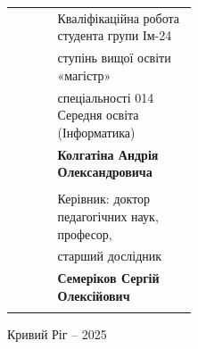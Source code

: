 \begin{titlepage}
\begin{tabular}{p{0.24\linewidth}l}
     & Кваліфікаційна робота студента групи Ім-24 \\ 
     & ступінь вищої освіти «магістр» \\
     & спеціальності 014 Середня освіта (Інформатика)\\
     & \textbf{\textbf{Колгатіна Андрія Олександровича}} \\
     & \\
     & Керівник: доктор педагогічних наук, професор, \\
     & старший дослідник\\
     & \textbf{Семеріков Сергій Олексійович} \\
     & \\
\end{tabular}
 
\vspace{4cm}

\begin{center}
 Кривий Ріг -- 2025
\end{center}
\end{titlepage}

\thispagestyle{empty}

\clearpage